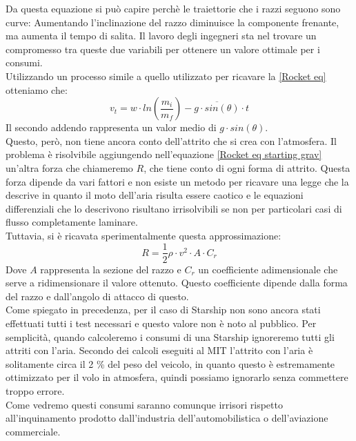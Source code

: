 Da questa equazione si può capire perchè le traiettorie che i razzi seguono sono curve: Aumentando l'inclinazione del razzo diminuisce la componente frenante, ma aumenta il tempo di salita. Il lavoro degli ingegneri sta nel trovare un compromesso tra queste due variabili per ottenere un valore ottimale per i consumi.\\
Utilizzando un processo simile a quello utilizzato per ricavare la \ref{Rocket eq} otteniamo che:
\begin{equation}
    \label{Rocket eq grav}
    v_t = w \cdot ln\left(\frac{m_i}{m_f}\right) - \overline{g \cdot sin(\theta)} \cdot t
\end{equation}
Il secondo addendo rappresenta un valor medio di $g \cdot sin(\theta)$.\\
Questo, però, non tiene ancora conto dell'attrito che si crea con l'atmosfera. Il problema è risolvibile aggiungendo nell'equazione \ref{Rocket eq starting grav} un'altra forza che chiameremo $R$, che tiene conto di ogni forma di attrito. Questa forza dipende da vari fattori e non esiste un metodo per ricavare una legge che la descrive in quanto il moto dell'aria risulta essere caotico e le equazioni differenziali che lo descrivono risultano irrisolvibili se non per particolari casi di flusso completamente laminare.\\
Tuttavia, si è ricavata sperimentalmente questa approssimazione:
$$
R = \frac{1}{2}\rho \cdot v^2 \cdot A \cdot C_r
$$
Dove $A$ rappresenta la sezione del razzo e $C_r$ un coefficiente adimensionale che serve a ridimensionare il valore ottenuto. Questo coefficiente dipende dalla forma del razzo e dall'angolo di attacco di questo.\\
Come spiegato in precedenza, per il caso di Starship non sono ancora stati effettuati tutti i test necessari e questo valore non è noto al pubblico. Per semplicità, quando calcoleremo i consumi di una Starship ignoreremo tutti gli attriti con l'aria. Secondo dei calcoli eseguiti al MIT \cite{einstein} l'attrito con l'aria è solitamente circa il 2 \% del peso del veicolo, in quanto questo è estremamente ottimizzato per il volo in atmosfera, quindi possiamo ignorarlo senza commettere troppo errore.\\
Come vedremo questi consumi saranno comunque irrisori rispetto all'inquinamento prodotto dall'industria dell'automobilistica o dell'aviazione commerciale.
